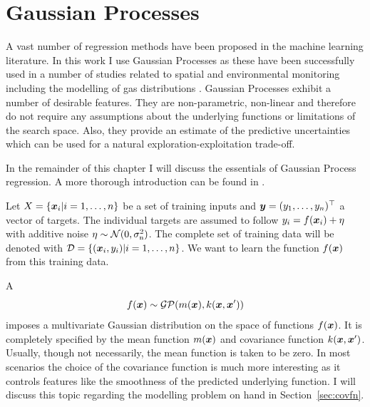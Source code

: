 \chapter{Gaussian Processes}\label{sec:gp}
A vast number of regression methods have been proposed in the machine learning 
literature. In this work I use Gaussian Processes as these have been 
successfully used in a number of studies related to spatial and environmental 
monitoring including the modelling of gas distributions 
\parencite[e.\,g.][]{Stranders:2008wl, Marchant:2012wb, Stachniss:2008vz}.  
Gaussian Processes exhibit a number of desirable features. They are 
non-parametric, non-linear and therefore do not require any assumptions about 
the underlying functions or limitations of the search space.  Also, they provide 
an estimate of the predictive uncertainties which can be used for a natural 
exploration-exploitation trade-off.

In the remainder of this chapter I will discuss the essentials of Gaussian 
Process regression. A more thorough introduction can be found in 
\textcite{Rasmussen:2006vz}.

Let $X = \{\bm{x}_i | i = 1, \dots, n\}$ be a set of training inputs and $\bm{y} = (y_1, \dots, y_n)^{\top}$ a vector of targets. The individual targets are 
assumed to follow $y_i = f(\bm{x}_i) + \eta$ with additive noise $\eta \sim 
\mathcal{N}(0, \sigma_{\mathrm{n}}^2)$. The complete set of training data will be 
denoted with $\mathcal{D} = \{(\bm{x}_i, y_i) | i = 1, \dots, n\}$. We want to 
learn the function $f(\bm{x})$ from this training data.

A 
\begin{equation}
    f(\bm{x}) \sim \mathcal{GP}(m(\bm{x}), k(\bm{x}, \bm{x}'))
\end{equation}
imposes a multivariate Gaussian distribution on the space of functions $f(\bm{x})$. It is completely specified by the mean function $m(\bm{x})$ and covariance 
function $k(\bm{x}, \bm{x}')$. Usually, though not necessarily, the mean function 
is taken to be zero. In most scenarios the choice of the covariance function is 
much more interesting as it controls features like the smoothness of the 
predicted underlying function. I will discuss this topic regarding the modelling 
problem on hand in Section~\ref{sec:covfn}.

